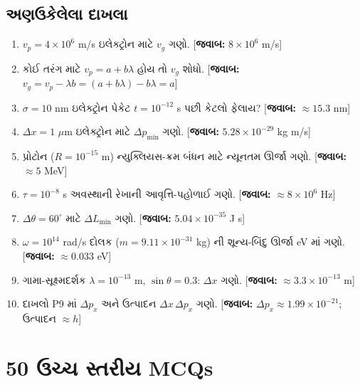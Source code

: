 \subsection{અણઉકેલેલા દાખલા}
\begin{enumerate}[label=\textbf{P\arabic*.}]
  \item $v_p=4\times10^{6}$ m/s ઇલેક્ટ્રોન માટે $v_g$ ગણો. \hfill [\textbf{જવાબ:} $8\times10^{6}$ m/s]
  \item કોઈ તરંગ માટે $v_p=a+b\lambda$ હોય તો $v_g$ શોધો. \hfill [\textbf{જવાબ:} $v_g=v_p-\lambda b=(a+b\lambda)-b\lambda=a$]
  \item $\sigma=10$ nm ઇલેક્ટ્રોન પેકેટ $t=10^{-12}$ s પછી કેટલો ફેલાય? \hfill [\textbf{જવાબ:} $\approx15.3$ nm]
  \item $\Delta x=1$ $\mu$m ઇલેક્ટ્રોન માટે $\Delta p_{\min}$ ગણો. \hfill [\textbf{જવાબ:} $5.28\times10^{-29}$ kg m/s]
  \item પ્રોટોન ($R=10^{-15}$ m) ન્યુક્લિયસ-ક્રમ બંધન માટે ન્યૂનતમ ઊર્જા ગણો. \hfill [\textbf{જવાબ:} $\approx5$ MeV]
  \item $\tau=10^{-8}$ s અવસ્થાની રેખાની આવૃત્તિ-પહોળાઈ ગણો. \hfill [\textbf{જવાબ:} $\approx8\times10^{6}$ Hz]
  \item $\Delta\theta=60^\circ$ માટે $\Delta L_{\min}$ ગણો. \hfill [\textbf{જવાબ:} $5.04\times10^{-35}$ J s]
  \item $\omega=10^{14}$ rad/s દોલક ($m=9.11\times10^{-31}$ kg) ની શૂન્ય-બિંદુ ઊર્જા eV માં ગણો. \hfill [\textbf{જવાબ:} $\approx0.033$ eV]
  \item ગામા-સૂક્ષ્મદર્શક $\lambda=10^{-13}$ m, $\sin\theta=0.3$: $\Delta x$ ગણો. \hfill [\textbf{જવાબ:} $\approx3.3\times10^{-13}$ m]
  \item દાખલો P9 માં $\Delta p_x$ અને ઉત્પાદન $\Delta x\,\Delta p_x$ ગણો. \hfill [\textbf{જવાબ:} $\Delta p_x\approx1.99\times10^{-21}$; ઉત્પાદન $\approx h$]
\end{enumerate}

\section{50 ઉચ્ચ સ્તરીય MCQs}

